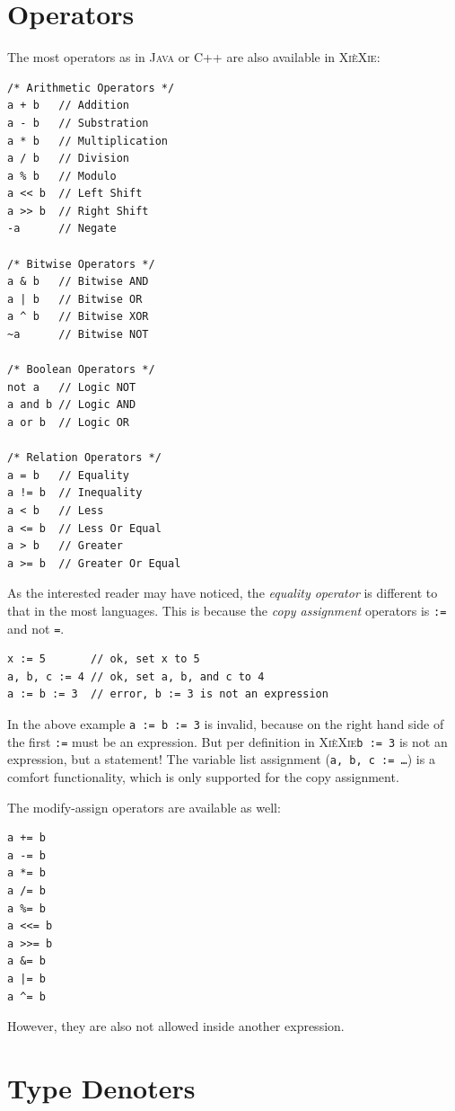\documentclass{report}
\def\xiexie{\textsc{Xi\`eXie}\xspace}
\def\cpp{\textsc{C++}\xspace}
\def\java{\textsc{Java}\xspace}
\begin{document}
\section{Operators}

The most operators as in \java or \cpp are also available in \xiexie:
\begin{lstlisting}
/* Arithmetic Operators */
a + b   // Addition
a - b   // Substration
a * b   // Multiplication
a / b   // Division
a % b   // Modulo
a << b  // Left Shift
a >> b  // Right Shift
-a      // Negate

/* Bitwise Operators */
a & b   // Bitwise AND
a | b   // Bitwise OR
a ^ b   // Bitwise XOR
~a      // Bitwise NOT

/* Boolean Operators */
not a   // Logic NOT
a and b // Logic AND
a or b  // Logic OR

/* Relation Operators */
a = b   // Equality
a != b  // Inequality
a < b   // Less
a <= b  // Less Or Equal
a > b   // Greater
a >= b  // Greater Or Equal
\end{lstlisting}
As the interested reader may have noticed, the \textit{equality operator} is different to that in the most languages.
This is because the \textit{copy assignment} operators is \texttt{:=} and not \texttt{=}.
\begin{lstlisting}
x := 5       // ok, set x to 5
a, b, c := 4 // ok, set a, b, and c to 4
a := b := 3  // error, b := 3 is not an expression
\end{lstlisting}
In the above example \texttt{a := b := 3} is invalid, because on the right hand side of the first \texttt{:=} must be
an expression. But per definition in \xiexie \texttt{b := 3} is not an expression, but a statement!
The variable list assignment (\texttt{a, b, c := \dots}) is a comfort functionality, which is only supported for the
copy assignment.

The modify-assign operators are available as well:
\begin{lstlisting}
a += b
a -= b
a *= b
a /= b
a %= b
a <<= b
a >>= b
a &= b
a |= b
a ^= b
\end{lstlisting}
However, they are also not allowed inside another expression.



\section{Type Denoters}
\end{document}
